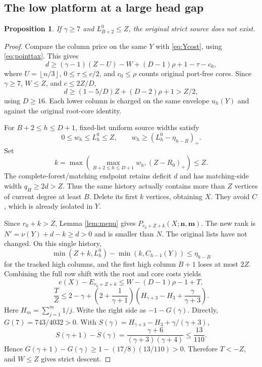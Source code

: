 \documentclass[11pt,a4paper]{article}
\newcommand{\nn}{\mathbf n}\newcommand{\mm}{\mathbf m}
\newcommand{\floor}[1]{\left\lfloor#1\right\rfloor}
\newtheorem{proposition}[theorem]{Proposition}
\theoremstyle{definition}
\begin{document}
\subsection{The low platform at a large head gap}
\begin{proposition}\label{prop:largegap-low}
If $\gamma\ge7$ and $L_{B+2}^0\le Z$, the original strict source does not exist.
\end{proposition}
\begin{proof}
Compare the column price on the same $Y$ with \eqref{eq:Ycost}, using \eqref{eq:pointtax}. This gives
\[
d\ge(\gamma-1)(Z-U)-W+(D-1)\rho+1-\tau-c_0,
\]
where $U=\floor{n/3}$, $0\le\tau\le c/2$, and $c_0\le\rho$ counts original port-free cores. Since $\gamma\ge7$, $W\le Z$, and $c\le2Z/D$,
\[
d\ge(1-5/D)Z+(D-2)\rho+1>Z/2,
\]
using $D\ge16$. Each lower column is charged on the same envelope $u_h(Y)$ and against the original root-core identity.

For $B+2\le h\le D+1$, fixed-list uniform source widths satisfy
\[
0\le w_h\le L_h^0\le Z,\qquad
w_h\ge(L_h^0-\eta_{h-B})_+.
\]
Set
\[
k=\max\left(\max_{B+2\le h\le D+1}w_h,(Z-R_0)_+\right)\le Z.
\]
The complete-forest/matching endpoint retains deficit $d$ and has matching-side width $q_H\ge2d>Z$. Thus the same history actually contains more than $Z$ vertices of current degree at least $B$. Delete its first $k$ vertices, obtaining $X$. They avoid $C$, which is already isolated in $Y$.

Since $r_0+k>Z$, Lemma \ref{lem:menu} gives
$P_{r_0+Z+k}(X;\nn,\mm)$. The new rank is
$N'=\nu(Y)+d-k\ge d>0$ and is smaller than $N$. The original lists have not changed.
On this single history,
\[
\min(Z+k,L_h^0)-\min(k,C_{h-1}(Y))\le\eta_{h-B}
\]
for the tracked high columns, and the first high column $B+1$ loses at most $2Z$. Combining the full row shift with the root and core costs yields
\[
e(X)-E_{r_0+Z+k}\le W-(D-1)\rho-1+T,
\]
\[
\frac TZ\le2-\gamma+
\left(2+\frac1{\gamma+1}\right)
\left(H_{\gamma+3}-H_3+\frac{\gamma}{\gamma+3}\right).
\]
Here $H_m=\sum_{j=1}^{m}1/j$. Write the right side as $-1-G(\gamma)$. Directly,
$G(7)=743/4032>0$. With
$S(\gamma)=H_{\gamma+3}-H_3+\gamma/(\gamma+3)$,
\[
S(\gamma+1)-S(\gamma)
=\frac{\gamma+6}{(\gamma+3)(\gamma+4)}\le\frac{13}{110}.
\]
Hence $G(\gamma+1)-G(\gamma)\ge1-(17/8)(13/110)>0$.
Therefore $T<-Z$, and $W\le Z$ gives strict descent.
\end{proof}
\end{document}
